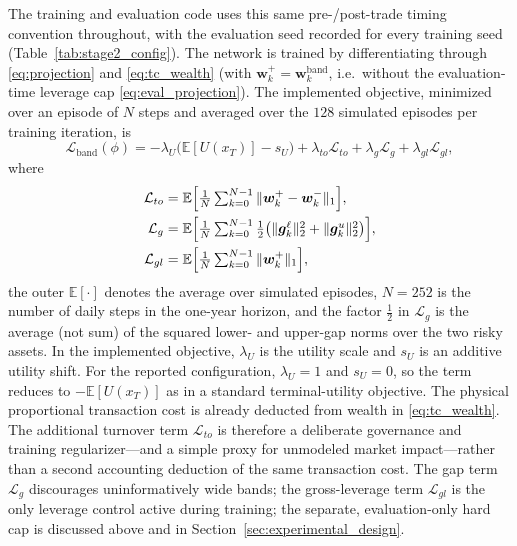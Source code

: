 \documentclass[a4paper,10pt]{article}
\newcommand{\E}{\mathbb{E}}
\newcommand{\bg}{\bm{g}}
\newcommand{\bw}{\bm{w}}
\begin{document}
The training and evaluation code uses this same pre-/post-trade timing convention throughout, with the evaluation seed recorded for every training seed (Table~\ref{tab:stage2_config}).
The network is trained by differentiating through \eqref{eq:projection} and \eqref{eq:tc_wealth} (with $\bw_k^+=\bw_k^{\mathrm{band}}$, i.e.\ without the evaluation-time leverage cap \eqref{eq:eval_projection}). The implemented objective, minimized over an episode of $N$ steps and averaged over the $128$ simulated episodes per training iteration, is
\begin{equation}
\mathcal L_{\mathrm{band}}(\phi)
=-\lambda_U\bigl(\E[U(x_T)]-s_U\bigr)
+\lambda_{to}\mathcal L_{to}
+\lambda_g\mathcal L_g
+\lambda_{gl}\mathcal L_{gl},
\label{eq:band_loss}
\end{equation}
where
\begin{align}
\mathcal L_{to}
&=\E\Bigl[\tfrac1N\textstyle\sum_{k=0}^{N-1}\|\bw_k^+-\bw_k^-\|_1\Bigr],\\
\mathcal L_g
&=\E\Bigl[\tfrac1N\textstyle\sum_{k=0}^{N-1}\tfrac12\bigl(\|\bg_k^\ell\|_2^2+\|\bg_k^u\|_2^2\bigr)\Bigr],\\
\mathcal L_{gl}
&=\E\Bigl[\tfrac1N\textstyle\sum_{k=0}^{N-1}\|\bw_k^+\|_1\Bigr],
\end{align}
the outer $\E[\cdot]$ denotes the average over simulated episodes, $N=252$ is the number of daily steps in the one-year horizon, and the factor $\tfrac12$ in $\mathcal L_g$ is the average (not sum) of the squared lower- and upper-gap norms over the two risky assets. In the implemented objective, $\lambda_U$ is the utility scale and $s_U$ is
an additive utility shift. For the reported configuration,
$\lambda_U=1$ and $s_U=0$, so the term reduces to
$-\E[U(x_T)]$ as in a standard terminal-utility objective. The physical proportional transaction cost is already deducted from wealth in \eqref{eq:tc_wealth}. The additional turnover term $\mathcal L_{to}$ is therefore a deliberate governance and training regularizer---and a simple proxy for unmodeled market impact---rather than a second accounting deduction of the same transaction cost. The gap term $\mathcal L_g$ discourages uninformatively wide bands; the gross-leverage term $\mathcal L_{gl}$ is the only leverage control active during training; the separate, evaluation-only hard cap is discussed above and in Section~\ref{sec:experimental_design}.
\end{document}
